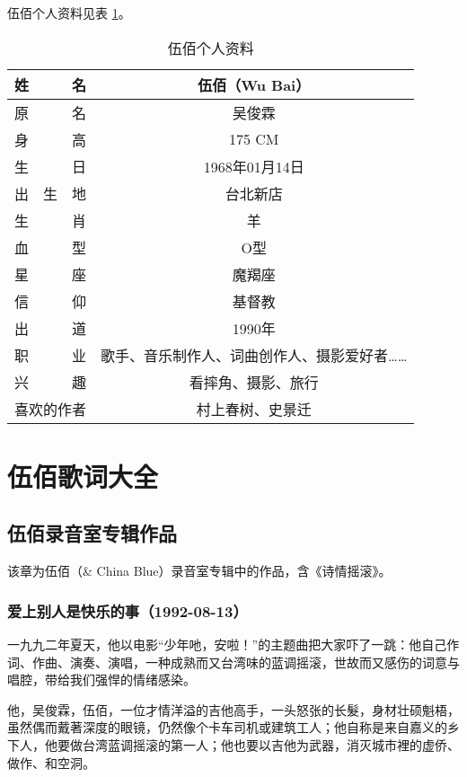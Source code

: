 \documentclass[UTF8,a4paper,oneside,twocolumn,12pt]{ctexbook}
\begin{document}
伍佰个人资料见表 \ref{tab:gerenziliao}。

\begin{table}[htbp]
	\caption{伍佰个人资料} \label{tab:gerenziliao}
	\centering
	\begin{tabular}{|c|c|}
		\hline
		姓　　　名 & 伍佰（Wu Bai） \\
		\hline
		原　　　名 & 吴俊霖 \\
		\hline
		身　　　高 & 175 CM \\
		\hline
		生　　　日 & 1968年01月14日 \\
		\hline
		出　生　地 & 台北新店 \\
		\hline
		生　　　肖 & 羊 \\
		\hline
		血　　　型 & O型 \\
		\hline
		星　　　座 & 魔羯座 \\
		\hline
		信　　　仰 & 基督教 \\
		\hline
		出　　　道 & 1990年 \\
		\hline
		职　　　业 & 歌手、音乐制作人、词曲创作人、摄影爱好者…… \\
		\hline
		兴　　　趣 & 看摔角、摄影、旅行 \\
		\hline
		喜欢的作者 & 村上春树、史景迁 \\
		\hline
	\end{tabular}
\end{table}

\tableofcontents

\mainmatter

\twocolumn
\part{伍佰歌词大全}
\chapter{伍佰录音室专辑作品}
该章为伍佰（\& China Blue）录音室专辑中的作品，含《诗情摇滚》。

\section*{爱上别人是快乐的事（1992-08-13）}
一九九二年夏天，他以电影“少年吔，安啦！”的主题曲把大家吓了一跳：他自己作词、作曲、演奏、演唱，一种成熟而又台湾味的蓝调摇滚，世故而又感伤的词意与唱腔，带给我们强悍的情绪感染。

他，吴俊霖，伍佰，一位才情洋溢的吉他高手，一头怒张的长髮，身材壮硕魁梧，虽然偶而戴著深度的眼镜，仍然像个卡车司机或建筑工人；他自称是来自嘉义的乡下人，他要做台湾蓝调摇滚的第一人；他也要以吉他为武器，消灭城市裡的虚侨、做作、和空洞。
\end{document}
